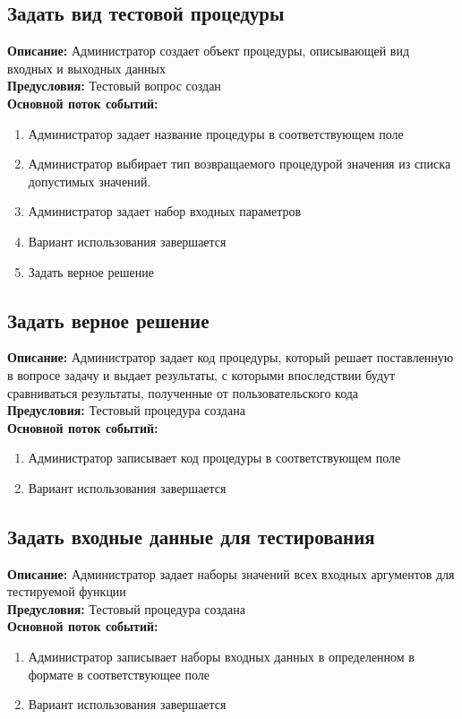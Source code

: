 \documentclass{article}
\begin{document}
    \subsection{Задать вид тестовой процедуры}
    \textbf{Описание:} Администратор создает объект процедуры, описывающей вид входных и выходных данных\\
    \textbf{Предусловия:} Тестовый вопрос создан\\
    \textbf{Основной поток событий:}
    \begin{enumerate}
        \item Администратор задает название процедуры в соответствующем поле
        \item Администратор выбирает тип возвращаемого процедурой значения из списка допустимых значений.
        \item Администратор задает набор входных параметров
        \item Вариант использования завершается
        \item Задать верное решение
    \end{enumerate}
    
    \subsection{Задать верное решение}
    \textbf{Описание:} Администратор задает код процедуры, который решает
    поставленную в вопросе задачу и выдает результаты, с которыми впоследствии
    будут сравниваться результаты, полученные от пользовательского кода\\
    \textbf{Предусловия:} Тестовый процедура создана\\
    \textbf{Основной поток событий:}
    \begin{enumerate}
        \item Администратор записывает код процедуры в соответствующем поле
        \item Вариант использования завершается
    \end{enumerate}

    \subsection{Задать входные данные для тестирования}
    \textbf{Описание:} Администратор задает наборы значений всех входных аргументов для тестируемой функции\\
    \textbf{Предусловия:} Тестовый процедура создана\\
    \textbf{Основной поток событий:}
    \begin{enumerate}
        \item Администратор записывает наборы входных данных в определенном в формате в соответствующее поле
        \item Вариант использования завершается
    \end{enumerate}
    
\end{document}
